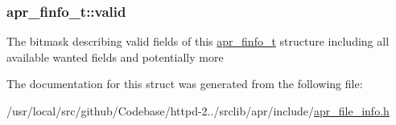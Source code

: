 \subsubsection[{\texorpdfstring{valid}{valid}}]{ apr\+\_\+finfo\+\_\+t\+::valid}\hypertarget{structapr__finfo__t_aff0cdf06637edec63c4701e582792019}{}\label{structapr__finfo__t_aff0cdf06637edec63c4701e582792019}
The bitmask describing valid fields of this \hyperlink{structapr__finfo__t}{apr\+\_\+finfo\+\_\+t} structure including all available \textquotesingle{}wanted\textquotesingle{} fields and potentially more 

The documentation for this struct was generated from the following file\+:\begin{DoxyCompactItemize}
\item 
/usr/local/src/github/\+Codebase/httpd-\/2../srclib/apr/include/\hyperlink{apr__file__info_8h}{apr\+\_\+file\+\_\+info.\+h}\end{DoxyCompactItemize}
